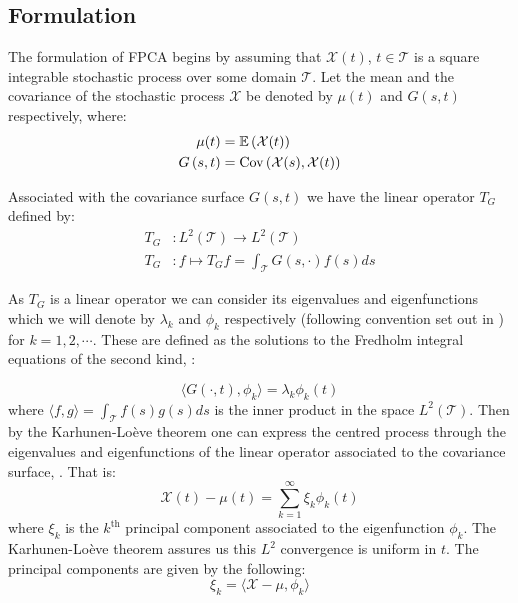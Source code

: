 \subsection{Formulation}
The formulation of FPCA begins by assuming that $\mathcal{X}(t)$, $t \in \mathcal{T}$ is a square integrable stochastic process over some domain $\mathcal{T}$.
Let the mean and the covariance of the stochastic process $\mathcal{X}$ be denoted by $\mu(t)$ and $G\left(s, t\right)$ respectively, where:
\begin{align}
	\mu(t) &= \operatorname{\mathbb{E}} \left(\mathcal{X}(t)\right) \label{eqn:mean_fn}\\
	G\left(s, t\right) &= \text{Cov}\left(\mathcal{X}(s),  \mathcal{X}(t)\right) \label{eqn:cov_fn}
\end{align}

Associated with the covariance surface $G\left(s, t\right)$ we have the linear operator $T_G$ defined by:
\begin{align}
	T_G &: L^2\left(\mathcal{T}\right) \to L^2\left(\mathcal{T}\right) \\
	T_G&:  f \mapsto T_G f = \int_{\mathcal{T}} G\left(s, \cdot \right) f(s) ds \label{eqn:t_op}
\end{align}

As $T_G$ is a linear operator we can consider its eigenvalues and eigenfunctions which we will denote by $\lambda_k$ and $\phi_k$ respectively (following convention set out in \citep{yao_functional_2005}) for $k=1,2,\cdots$.
These are defined as the solutions to the Fredholm integral equations of the second kind, \citep{yao_functional_2005}: 

\begin{equation}\label{eqn:fredholm}
	\langle G(\cdot, t), \phi_k \rangle = \lambda_k \phi_k(t)
\end{equation}
where $\langle f, g \rangle = \int_{\mathcal{T}} f(s) g(s) ds$ is the inner product in the space $L^2(\mathcal{T})$. 
Then by the Karhunen-Lo\`{e}ve theorem one can express the centred process through the eigenvalues and eigenfunctions of the linear operator associated to the covariance surface, \citep{karhunen_zur_1946, loeve_fonctions_1946}.
That is:
\begin{equation}\label{eqn:fpca}
	\mathcal{X}(t) - \mu(t) = \sum_{k=1}^{\infty}\xi_k \phi_k(t)
\end{equation}
where $\xi_k$ is the $k^\text{th}$ principal component associated to the eigenfunction $\phi_k$.
The Karhunen-Lo\`{e}ve theorem assures us this $L^2$ convergence is uniform in $t$.
The principal components are given by the following: 
\begin{equation}\label{eqn:principal_comp}
	\xi_k= \langle \mathcal{X} - \mu, \phi_k \rangle 
\end{equation}

